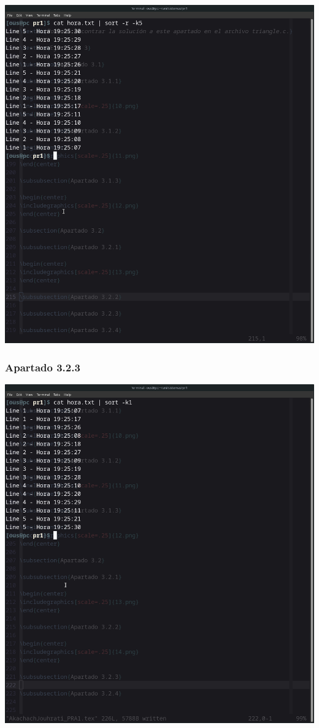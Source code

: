 \documentclass[spanish]{article}
\begin{document}
\begin{center}
\includegraphics[scale=.25]{../img/14.png}
\end{center}

\newpage

\subsubsection{Apartado 3.2.3}

\begin{center}
\includegraphics[scale=.25]{../img/15.png}
\end{center}
\end{document}
